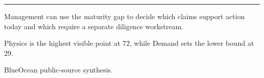 \documentclass[10pt,a4paper]{article}
\begin{document}
\vspace{3pt}\noindent\begin{minipage}[t]{0.58\linewidth}
\textcolor{BOGreen}{\rule{24mm}{0.6pt}}\par\vspace{3pt}
{\footnotesize\color{BOText} Management can use the maturity gap to decide which claims support action today and which require a separate diligence workstream.}\par\vspace{2pt}
{\footnotesize\color{BOText} Physics is the highest visible point at 72, while Demand sets the lower bound at 29.}\par\vspace{2pt}
\end{minipage}\hfill\begin{minipage}[t]{0.36\linewidth}
\par
\end{minipage}\par\vspace{2pt}
\par
{\scriptsize\color{BOMuted} BlueOcean public-source synthesis.}\par
\end{document}
